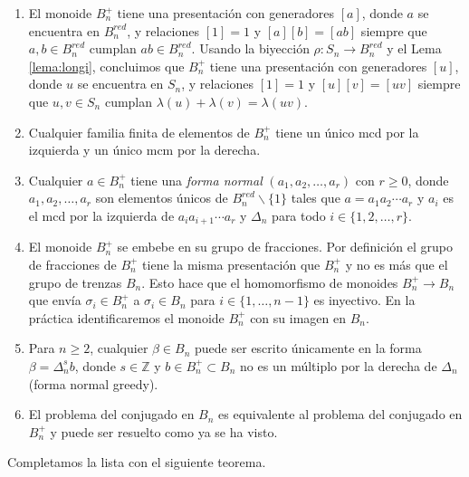 \documentclass[12pt]{book}
\theoremstyle{definition}
\begin{document}
\begin{enumerate}[label=(\arabic*)]
\item El monoide $B_n^+$ tiene una presentación con generadores $[a]$, donde $a$ se encuentra en $B_n^{red}$, y relaciones $[1]=1$ y $[a][b]=[ab]$ siempre que $a,b\in B_n^{red}$ cumplan $ab\in B_n^{red}$. Usando la biyección $\rho: S_n\rightarrow B_n^{red}$ y el Lema \ref{lema:longi}, concluimos que $B_n^+$ tiene una presentación con generadores $[u]$, donde $u$ se encuentra en $S_n$, y relaciones $[1]=1$ y $[u][v]=[uv]$ siempre que $u,v\in S_n$ cumplan $\lambda(u)+\lambda(v)=\lambda(uv)$.
\item Cualquier familia finita de elementos de $B_n^+$ tiene un único mcd por la izquierda y un único mcm por la derecha.
\item Cualquier $a\in B_n^+$ tiene una \textit{forma normal} $(a_1,a_2,\ldots, a_r)$ con $r\geq 0$, donde $a_1,a_2,\ldots, a_r$ son elementos únicos de $B_n^{red}\backslash\{1\}$ tales que $a=a_1a_2\cdots a_r$ y $a_i$ es el mcd por la izquierda de $a_ia_{i+1}\cdots a_r$ y $\Delta_n$ para todo $i\in\{1,2,\ldots,r\}$.
\item El monoide $B_n^+$ se embebe en su grupo de fracciones. Por definición el grupo de fracciones de $B_n^+$ tiene la misma presentación que $B_n^+$ y no es más que el grupo de trenzas $B_n$. Esto hace que el homomorfismo de monoides $B_n^+\rightarrow B_n$ que envía $\sigma_i\in B_n^+$ a $\sigma_i\in B_n$ para $i\in\{1,\ldots, n-1\}$ es inyectivo. En la práctica identificaremos el monoide $B_n^+$ con su imagen en $B_n$.
\item Para $n\geq 2$, cualquier $\beta\in B_n$ puede ser escrito únicamente en la forma $\beta=\Delta_n^sb$, donde $s\in\mathbb{Z}$ y $b\in B_n^+\subset B_n$ no es un múltiplo por la derecha de $\Delta_n$ (forma normal greedy).
\item El problema del conjugado en $B_n$ es equivalente al problema del conjugado en $B_n^+$ y puede ser resuelto como ya se ha visto.
\end{enumerate}

Completamos la lista con el siguiente teorema.
\end{document}
